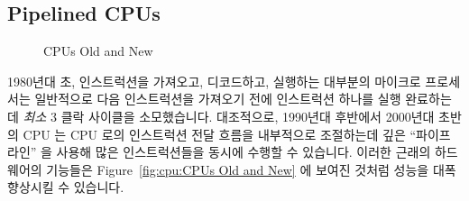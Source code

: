 \subsection{Pipelined CPUs}
\label{sec:cpu:Pipelined CPUs}

\begin{figure}[tb]
\begin{center}
\end{center}
\caption{CPUs Old and New}
\end{figure}

1980년대 초, 인스트럭션을 가져오고, 디코드하고, 실행하는 대부분의 마이크로
프로세서는 일반적으로 다음 인스트럭션을 가져오기 전에 인스트럭션 하나를 실행
완료하는데 \emph{최소} 3 클락 사이클을 소모했습니다.
대조적으로, 1990년대 후반에서 2000년대 초반의 CPU 는 CPU 로의 인스트럭션 전달
흐름을 내부적으로 조절하는데 깊은 ``파이프라인'' 을 사용해 많은 인스트럭션들을
동시에 수행할 수 있습니다.
이러한 근래의 하드웨어의 기능들은 Figure~\ref{fig:cpu:CPUs Old and New} 에
보여진 것처럼 성능을 대폭 향상시킬 수 있습니다.

